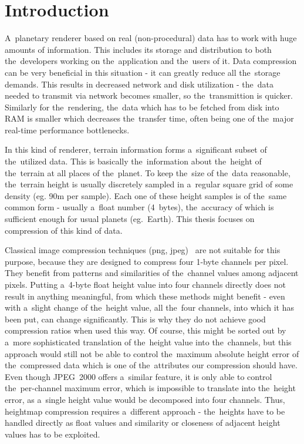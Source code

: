 \chapter*{Introduction}\label{chap:introduction}

A~planetary renderer based on real (non-procedural) data has to work with huge amounts of information. This includes its storage and distribution to both the~developers working on the~application and the~users of it. Data compression can be very beneficial in this situation - it can greatly reduce all the~storage demands. This results in decreased network and disk utilization - the~data needed to transmit via network becomes smaller, so the~transmittion is quicker. Similarly for the~rendering, the~data which has to be fetched from disk into RAM is smaller which decreases the~transfer time, often being one of the~major real-time performance bottlenecks. 

In this kind of renderer, terrain information forms a~significant subset of the~utilized data. This is basically the~information about the~height of the~terrain at all places of the~planet. To keep the~size of the~data reasonable, the~terrain height is usually discretely sampled in a~regular square grid of some density (eg. 90m per sample). Each one of these height samples is of the~same common form - usually a~float number (4~bytes), the~accuracy of which is sufficient enough for usual planets (eg.~Earth). This thesis focuses on compression of this kind of data. 

Classical image compression techniques (png, jpeg)~\cite{jpeg, basicFormats} are not suitable for this purpose, because they are designed to compress four 1-byte channels per pixel. They benefit from patterns and similarities of the~channel values among adjacent pixels. Putting a~4-byte float height value into four channels directly does not result in anything meaningful, from which these methods might benefit -  even with a~slight change of the~height value, all the~four channels, into which it has been put, can change significantly. This is why they do not achieve good compression ratios when used this way. Of course, this might be sorted out by a~more sophisticated translation of the~height value into the~channels, but this approach would still not be able to control the~maximum absolute height error of the~compressed data which is one of the~attributes our compression should have. Even though JPEG~2000 offers a~similar feature, it is only able to control the~per-channel maximum error, which is impossible to translate into the~height error, as a~single height value would be decomposed into four channels. Thus, heightmap compression requires a~different approach - the~heights have to be handled directly as float values and similarity or closeness of adjacent height values has to be exploited.

